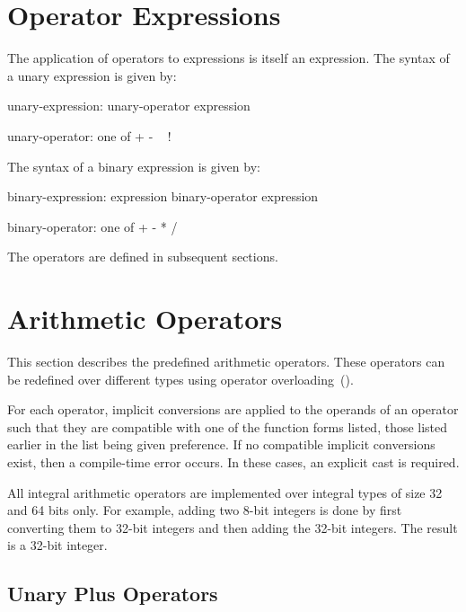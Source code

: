 \section{Operator Expressions}
\label{Binary_Expressions}
\label{Unary_Expressions}

The application of operators to expressions is itself an expression.
The syntax of a unary expression is given by:
\begin{syntax}
unary-expression:
  unary-operator expression

unary-operator: one of
  + - ~ !
\end{syntax}

The syntax of a binary expression is given by:
\begin{syntax}
binary-expression:
  expression binary-operator expression

binary-operator: one of
  + - * / %
\end{syntax}

The operators are defined in subsequent sections.

\section{Arithmetic Operators}
\label{Arithmetic_Operators}

This section describes the predefined arithmetic operators.  These
operators can be redefined over different types using operator
overloading~().

For each operator, implicit conversions are applied to the operands of
an operator such that they are compatible with one of the function
forms listed, those listed earlier in the list being given
preference.  If no compatible implicit conversions exist, then a
compile-time error occurs.  In these cases, an explicit cast is required.

All integral arithmetic operators are implemented over integral types
of size 32 and 64 bits only.  For example, adding two 8-bit integers
is done by first converting them to 32-bit integers and then adding
the 32-bit integers.  The result is a 32-bit integer.

\subsection{Unary Plus Operators}
\label{Unary_Plus_Operators}

